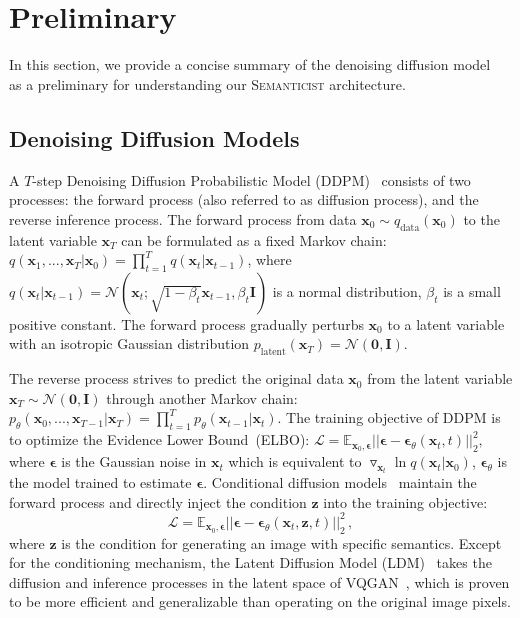 \documentclass[10pt,twocolumn,letterpaper]{article}
\DeclareRobustCommand{\modelname}{\textsc{Semanticist}\xspace}
\begin{document}
\section{Preliminary}
\label{sec:diffusion_prelim}
In this section, we provide a concise summary of the denoising diffusion model~\cite{DDPM} as a preliminary for understanding our \modelname architecture.

\subsection{Denoising Diffusion Models}

A $T$-step Denoising Diffusion Probabilistic Model (DDPM)~\cite{DDPM} consists of two processes: the forward process (also referred to as diffusion process), and the reverse inference process. 
The forward process from data $\bm{x}_0 \sim q_{\text{data}}(\bm{x}_0)$ to the latent variable $\bm{x}_T$ can be formulated as a fixed Markov chain: $q(\bm{x}_1, ..., \bm{x}_T | \bm{x}_0) = \prod_{t=1}^T q(\bm{x}_t | \bm{x}_{t-1})$,
where $q(\bm{x}_t | \bm{x}_{t-1}) = \mathcal{N}(\bm{x}_t; \sqrt{1-\beta_t}\bm{x}_{t-1}, \beta_t \bm{I})$ is a normal distribution, $\beta_t$ is a small positive constant. The forward process gradually perturbs $\bm{x}_0$ to a latent variable with an isotropic Gaussian distribution $p_{\text{latent}}(\bm{x}_T) = \mathcal{N}(\mathbf{0}, \bm{I})$. 

The reverse process strives to predict the original data $\bm{x}_0$ from the latent variable $\bm{x}_T \sim \mathcal{N}(\mathbf{0}, \bm{I})$ through another Markov chain:
$p_{\theta}(\bm{x}_0, ..., \bm{x}_{T-1} | \bm{x}_T) =  \prod_{t=1}^T p_{\theta}(\bm{x}_{t-1} | \bm{x}_t)$.
The training objective of DDPM is to optimize the Evidence Lower Bound~(ELBO):
$\mathcal{L}=\mathbb{E}_{\bm{x}_0, \bm{\epsilon}}||\bm{\epsilon}-\bm{\epsilon}_{\theta}(\bm{x}_t, t)||^2_2,$ 
where $\bm{\epsilon}$ is the Gaussian noise in $\bm{x}_t$ which is equivalent to $\triangledown_{\bm{x}_t}  \ln{q(\bm{x}_t | \bm{x}_0)} $, $\bm{\epsilon}_{\theta}$ is the model trained to estimate $\bm{\epsilon}$.
Conditional diffusion models~\cite{LDM} maintain the forward process and directly inject the condition $\bm{z}$ into the training objective:
\begin{equation}
\mathcal{L}=\mathbb{E}_{\bm{x}_0, \bm{\epsilon}}||\bm{\epsilon}-\bm{\epsilon}_{\theta}(\bm{x}_t, \bm{z}, t)||^2_2 \,, \nonumber
\end{equation}
where $\bm{z}$ is the condition for generating an image with specific semantics.
Except for the conditioning mechanism, the Latent Diffusion Model (LDM)~\cite{LDM} takes the diffusion and inference processes in the latent space of VQGAN~\cite{VQGAN}, which is proven to be more efficient and generalizable than operating on the original image pixels.
\end{document}
